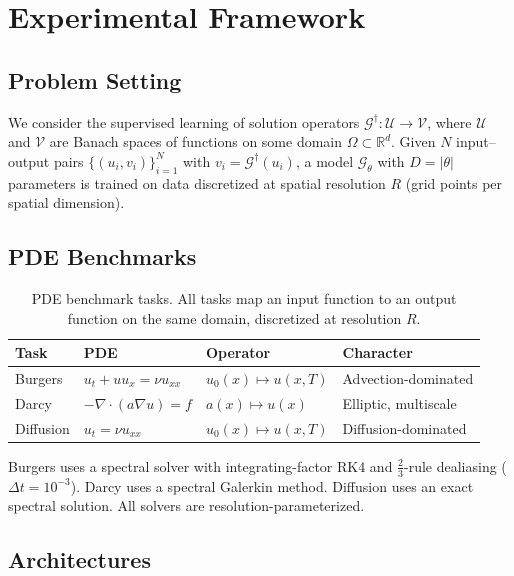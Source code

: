 \documentclass[11pt]{article}
\begin{document}
\section{Experimental Framework}
\label{sec:framework}

\subsection{Problem Setting}
\label{sec:problem}

We consider the supervised learning of solution operators
$\mathcal{G}^\dagger : \mathcal{U} \to \mathcal{V}$, where
$\mathcal{U}$ and $\mathcal{V}$ are Banach spaces of functions on
some domain $\Omega \subset \mathbb{R}^d$. Given $N$ input--output
pairs $\{(u_i, v_i)\}_{i=1}^N$ with
$v_i = \mathcal{G}^\dagger(u_i)$, a model $\mathcal{G}_\theta$ with
$D = |\theta|$ parameters is trained on data discretized at spatial
resolution $R$ (grid points per spatial dimension).

\subsection{PDE Benchmarks}

\begin{table}[h]
\centering
\caption{PDE benchmark tasks. All tasks map an input function to an
output function on the same domain, discretized at resolution $R$.}
\label{tab:tasks}
\begin{tabular}{@{}llll@{}}
\toprule
\textbf{Task} & \textbf{PDE} & \textbf{Operator} & \textbf{Character} \\
\midrule
Burgers & $u_t + u u_x = \nu u_{xx}$ &
  $u_0(x) \mapsto u(x, T)$ & Advection-dominated \\
Darcy & $-\nabla \cdot (a \nabla u) = f$ &
  $a(x) \mapsto u(x)$ & Elliptic, multiscale \\
Diffusion & $u_t = \nu u_{xx}$ &
  $u_0(x) \mapsto u(x, T)$ & Diffusion-dominated \\
\bottomrule
\end{tabular}
\end{table}

\noindent
Burgers uses a spectral solver with integrating-factor RK4 and
$\frac{2}{3}$-rule dealiasing ($\Delta t = 10^{-3}$).
Darcy uses a spectral Galerkin method.
Diffusion uses an exact spectral solution. All solvers are
resolution-parameterized.

\subsection{Architectures}
\end{document}
